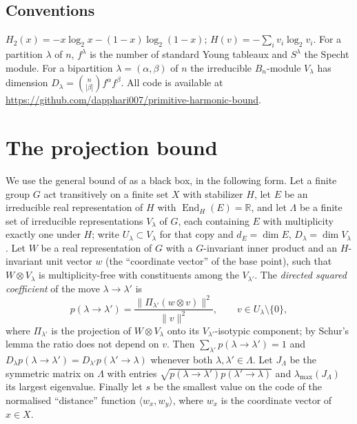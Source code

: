 \documentclass[11pt]{amsart}
\theoremstyle{definition}
\newcommand{\R}{\mathbb R}
\newcommand{\End}{\operatorname{End}}
\newcommand{\Htwo}{H_2}
\begin{document}
\subsection{Conventions}
$\Htwo(x)=-x\log_2x-(1-x)\log_2(1-x)$; $H(v)=-\sum_iv_i\log_2v_i$. For a partition $\lambda$ of $n$, $f^\lambda$ is the number of standard Young tableaux and $S^\lambda$ the Specht module. For a bipartition $\lambda=(\alpha,\beta)$ of $n$ the irreducible $B_n$-module $V_\lambda$ has dimension $D_\lambda=\binom n{|\beta|}f^\alpha f^\beta$. All code is available at \url{https://github.com/dapphari007/primitive-harmonic-bound}.

\section{The projection bound}\label{sec:bound}

We use the general bound of \cite[Thm.~4.2]{OAI2026} as a black box, in the following form. Let a finite group $G$ act transitively on a finite set $X$ with stabilizer $H$, let $E$ be an irreducible real representation of $H$ with $\End_H(E)=\R$, and let $\Lambda$ be a finite set of irreducible representations $V_\lambda$ of $G$, each containing $E$ with multiplicity exactly one under $H$; write $U_\lambda\subset V_\lambda$ for that copy and $d_E=\dim E$, $D_\lambda=\dim V_\lambda$. Let $W$ be a real representation of $G$ with a $G$-invariant inner product and an $H$-invariant unit vector $w$ (the ``coordinate vector'' of the base point), such that $W\otimes V_\lambda$ is multiplicity-free with constituents among the $V_{\lambda'}$. The \emph{directed squared coefficient} of the move $\lambda\to\lambda'$ is
\begin{equation}\label{eq:pdef}
p(\lambda\to\lambda')=\frac{\|\Pi_{\lambda'}(w\otimes v)\|^2}{\|v\|^2},\qquad v\in U_\lambda\setminus\{0\},
\end{equation}
where $\Pi_{\lambda'}$ is the projection of $W\otimes V_\lambda$ onto its $V_{\lambda'}$-isotypic component; by Schur's lemma the ratio does not depend on $v$. Then $\sum_{\lambda'}p(\lambda\to\lambda')=1$ and $D_\lambda p(\lambda\to\lambda')=D_{\lambda'}p(\lambda'\to\lambda)$ whenever both $\lambda,\lambda'\in\Lambda$. Let $J_\Lambda$ be the symmetric matrix on $\Lambda$ with entries $\sqrt{p(\lambda\to\lambda')p(\lambda'\to\lambda)}$ and $\lambda_{\max}(J_\Lambda)$ its largest eigenvalue. Finally let $s$ be the smallest value on the code of the normalised ``distance'' function $\langle w_x,w_y\rangle$, where $w_x$ is the coordinate vector of $x\in X$.
\end{document}
